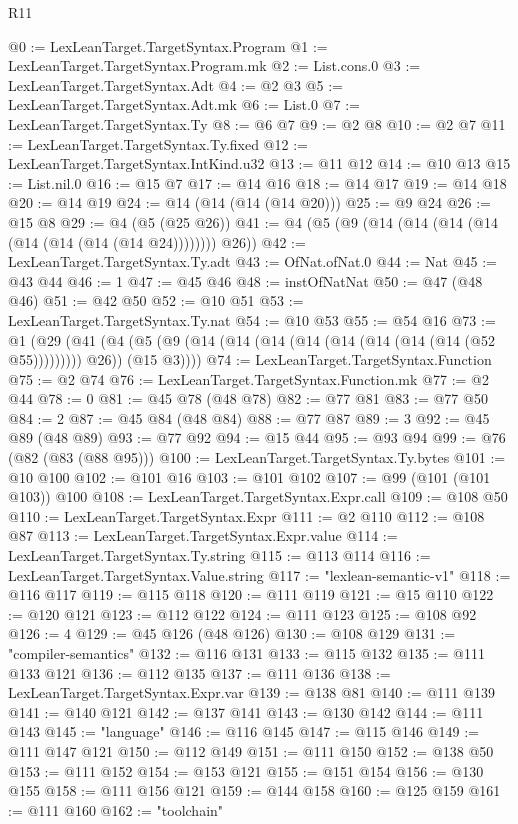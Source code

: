 \begin{lexlean}{R11}
\begin{coremodule}
@0 := LexLeanTarget.TargetSyntax.Program
@1 := LexLeanTarget.TargetSyntax.Program.mk
@2 := List.cons.{0}
@3 := LexLeanTarget.TargetSyntax.Adt
@4 := @2 @3
@5 := LexLeanTarget.TargetSyntax.Adt.mk
@6 := List.{0}
@7 := LexLeanTarget.TargetSyntax.Ty
@8 := @6 @7
@9 := @2 @8
@10 := @2 @7
@11 := LexLeanTarget.TargetSyntax.Ty.fixed
@12 := LexLeanTarget.TargetSyntax.IntKind.u32
@13 := @11 @12
@14 := @10 @13
@15 := List.nil.{0}
@16 := @15 @7
@17 := @14 @16
@18 := @14 @17
@19 := @14 @18
@20 := @14 @19
@24 := @14 (@14 (@14 (@14 @20)))
@25 := @9 @24
@26 := @15 @8
@29 := @4 (@5 (@25 @26))
@41 := @4 (@5 (@9 (@14 (@14 (@14 (@14 (@14 (@14 (@14 (@14 @24)))))))) @26))
@42 := LexLeanTarget.TargetSyntax.Ty.adt
@43 := OfNat.ofNat.{0}
@44 := Nat
@45 := @43 @44
@46 := 1
@47 := @45 @46
@48 := instOfNatNat
@50 := @47 (@48 @46)
@51 := @42 @50
@52 := @10 @51
@53 := LexLeanTarget.TargetSyntax.Ty.nat
@54 := @10 @53
@55 := @54 @16
@73 := @1
    (@29
      (@41 (@4 (@5 (@9 (@14 (@14 (@14 (@14 (@14 (@14 (@14 (@14 (@52 @55))))))))) @26)) (@15 @3))))
@74 := LexLeanTarget.TargetSyntax.Function
@75 := @2 @74
@76 := LexLeanTarget.TargetSyntax.Function.mk
@77 := @2 @44
@78 := 0
@81 := @45 @78 (@48 @78)
@82 := @77 @81
@83 := @77 @50
@84 := 2
@87 := @45 @84 (@48 @84)
@88 := @77 @87
@89 := 3
@92 := @45 @89 (@48 @89)
@93 := @77 @92
@94 := @15 @44
@95 := @93 @94
@99 := @76 (@82 (@83 (@88 @95)))
@100 := LexLeanTarget.TargetSyntax.Ty.bytes
@101 := @10 @100
@102 := @101 @16
@103 := @101 @102
@107 := @99 (@101 (@101 @103)) @100
@108 := LexLeanTarget.TargetSyntax.Expr.call
@109 := @108 @50
@110 := LexLeanTarget.TargetSyntax.Expr
@111 := @2 @110
@112 := @108 @87
@113 := LexLeanTarget.TargetSyntax.Expr.value
@114 := LexLeanTarget.TargetSyntax.Ty.string
@115 := @113 @114
@116 := LexLeanTarget.TargetSyntax.Value.string
@117 := "lexlean-semantic-v1"
@118 := @116 @117
@119 := @115 @118
@120 := @111 @119
@121 := @15 @110
@122 := @120 @121
@123 := @112 @122
@124 := @111 @123
@125 := @108 @92
@126 := 4
@129 := @45 @126 (@48 @126)
@130 := @108 @129
@131 := "compiler-semantics"
@132 := @116 @131
@133 := @115 @132
@135 := @111 @133 @121
@136 := @112 @135
@137 := @111 @136
@138 := LexLeanTarget.TargetSyntax.Expr.var
@139 := @138 @81
@140 := @111 @139
@141 := @140 @121
@142 := @137 @141
@143 := @130 @142
@144 := @111 @143
@145 := "language"
@146 := @116 @145
@147 := @115 @146
@149 := @111 @147 @121
@150 := @112 @149
@151 := @111 @150
@152 := @138 @50
@153 := @111 @152
@154 := @153 @121
@155 := @151 @154
@156 := @130 @155
@158 := @111 @156 @121
@159 := @144 @158
@160 := @125 @159
@161 := @111 @160
@162 := "toolchain"

\end{coremodule}
\end{lexlean}

